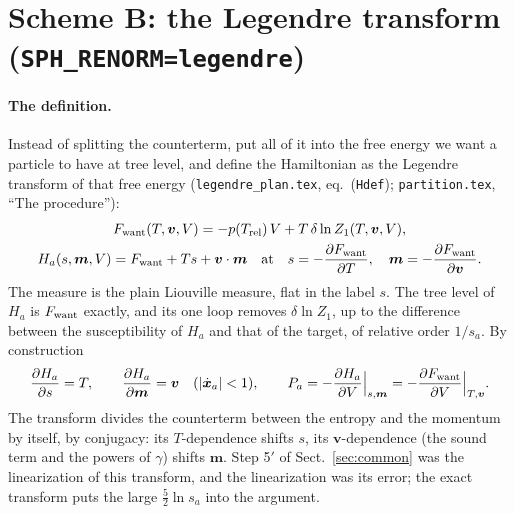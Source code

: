 \documentclass[11pt,aps,preprint,nofootinbib,superscriptaddress,tightenlines]{revtex4-2}
\def\st{\begin{equation}}
\def\stp{\end{equation}}
\def\Sect#1{Sect.~\ref{#1}}
\let\oldparagraph\paragraph
\renewcommand{\paragraph}{\par\bigskip\oldparagraph}
\begin{document}
\section{Scheme B: the Legendre transform (\texttt{SPH\_RENORM=legendre})}
\label{sec:legendre}

\paragraph{The definition.}  Instead of splitting the counterterm, put all of it into the free energy we want a particle to have at tree level, and
define the Hamiltonian as the Legendre transform of that free energy (\nolinkurl{legendre_plan.tex}, eq.~(\texttt{Hdef}); \nolinkurl{partition.tex}, ``The procedure''):
\st
\begin{gathered}
F_{\rm want}(T,\bm v,V)=-p(T_{\rm rel})\,V+T\,\delta\ln Z_1(T,\bm v,V),\\
H_a(s,\bm m,V)=F_{\rm want}+Ts+\bm v\cdot\bm m\quad\text{at}\quad s=-\frac{\partial F_{\rm want}}{\partial T},\quad \bm m=-\frac{\partial F_{\rm want}}{\partial\bm v} .
\end{gathered}
\label{eq:Hleg}
\stp
The measure is the plain Liouville measure, flat in the label $s$.  The tree level of $H_a$ is $F_{\rm want}$ exactly, and its one loop removes
$\delta\ln Z_1$, up to the difference between the susceptibility of $H_a$ and that of the target, of relative order $1/s_a$.  By construction
\st
\frac{\partial H_a}{\partial s}=T,\qquad \frac{\partial H_a}{\partial\bm m}=\bm v\quad(|\dot{\bm x}_a|<1),\qquad
P_a=-\frac{\partial H_a}{\partial V}\Big|_{s,\bm m}=-\frac{\partial F_{\rm want}}{\partial V}\Big|_{T,\bm v} .
\stp
The transform divides the counterterm between the entropy and the momentum by itself, by conjugacy: its $T$-dependence shifts $s$, its
$\bm v$-dependence (the sound term and the powers of $\gamma$) shifts $\bm m$.  Step 5$'$ of \Sect{sec:common} was the linearization of this transform,
and the linearization was its error; the exact transform puts the large $\tfrac52\ln s_a$ into the argument.
\end{document}
